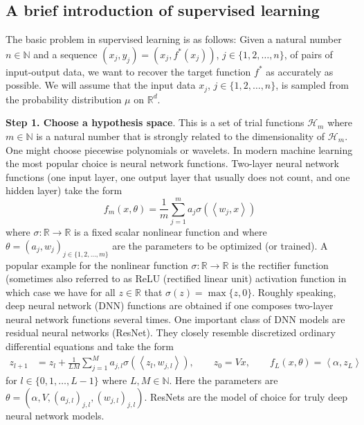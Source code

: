 \documentclass[12pt]{article}
\theoremstyle{definition}
\newcommand{\R}{\mathbb{R}}
\newcommand{\N}{\mathbb{N}}
\newcommand{\cH}{\mathcal{H}}
\newcommand{\bx}{{x}}
\begin{document}
\subsection{A brief introduction of supervised learning}
\label{sec:intro_deep_learning}

The basic problem in supervised learning is as follows:
Given a natural number $ n \in \N $
and a sequence 
$ ( \bx_j, y_j ) = ( \bx_j , f^*( \bx_j ) ) $,
$ j \in \{ 1, 2, \dots, n \} $, 
of pairs of input-output data,  
%
we want to  recover the target function $ f^* $ as accurately as possible. 
We will assume that the input data $ \bx_j $, $ j \in \{ 1, 2, \dots, n \} $, 
is sampled from the probability distribution $ \mu $ on $ \R^d $.

{\bf Step 1. Choose a hypothesis space}. This is a set of trial functions $ \cH_m $
where $ m \in \N $ is a natural number that is strongly related to the dimensionality of $\cH_m$.
One might choose piecewise polynomials or wavelets.
In modern machine learning the most popular  choice is neural network functions.
Two-layer neural network functions (one input layer, one output layer that usually does not count, and one hidden layer) take the form 
\begin{equation}
f_m(\bx,  \theta) =
\frac 1 m \sum_{ j = 1 }^m a_j \sigma( \left< w_j , x \right> )
\end{equation}
where $ \sigma \colon \R \to \R $ is a fixed scalar nonlinear function 
and where $ \theta = ( a_j, w_j )_{ j \in \{ 1, 2, \dots, m \} } $ are the parameters to be optimized (or trained). 
A popular example for the nonlinear function $ \sigma \colon \R \to \R $ is the rectifier function (sometimes also referred to 
as ReLU (rectified linear unit) activation function in which case we have for all 
$ z \in \R $ that 
$ \sigma(z) = \max\{ z, 0 \} $. 
Roughly speaking, deep neural network (DNN) functions are obtained if one composes two-layer neural network functions several times.
One important class of DNN models are residual neural networks (ResNet). They closely resemble discretized 
ordinary differential equations and take the form 
\begin{align}
\label{ResNet}
z_{l+1} & = z_l + \frac 1 {LM} \sum_{j=1}^M a_{j,l}\sigma( \left< z_l, w_{j,l} \right> ), 
\qquad
z_0 = V{\bx}, 
\qquad
%
f_L(\bx, \theta) = \left< \alpha, z_L \right>
\end{align}
for $ l \in \{ 0, 1, \dots, L - 1 \} $ where $ L, M \in \N $. 
Here the parameters are 
$ 
  \theta 
  = ( \alpha, V, 
    ( a_{j,l} )_{ j, l } 
    , 
    ( w_{ j, l } )_{ j, l }
%
  ) 
$.
ResNets are the model of choice for truly deep neural network models. 
\end{document}
